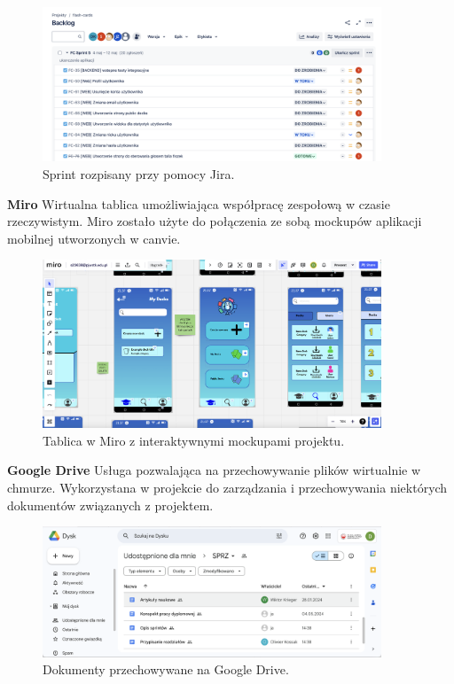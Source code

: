\begin{figure}[H]
    \centering
    \includegraphics[width=0.9\textwidth]{chapters/chapter_7/jira}
    \caption{Sprint rozpisany przy pomocy Jira.}
    \label{img:jira}
\end{figure}


\textbf{Miro} Wirtualna tablica umożliwiająca współpracę zespołową w czasie rzeczywistym. Miro zostało użyte do połączenia ze sobą mockupów aplikacji mobilnej utworzonych w canvie.

\begin{figure}[H]
    \centering
    \includegraphics[width=0.9\textwidth]{chapters/chapter_7/miro}
    \caption{Tablica w Miro z interaktywnymi mockupami projektu.}
    \label{img:miro}
\end{figure}


\textbf{Google Drive} Usługa pozwalająca na przechowywanie plików wirtualnie w chmurze. Wykorzystana w projekcie do zarządzania i przechowywania niektórych dokumentów związanych z projektem.

\begin{figure}[H]
    \centering
    \includegraphics[width=0.9\textwidth]{chapters/chapter_7/google_drive}
    \caption{Dokumenty przechowywane na Google Drive.}
    \label{img:google_drive}
\end{figure}


